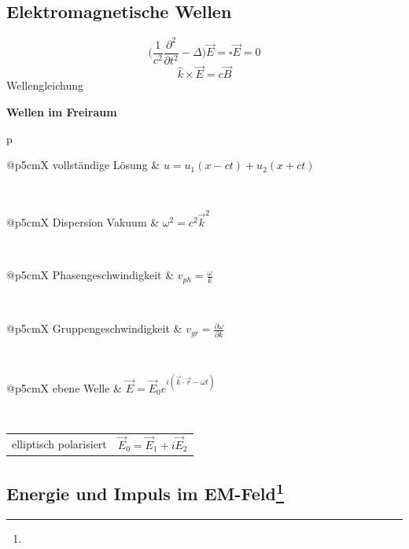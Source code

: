 \documentclass[12pt,a4paper, twoside]{article}
\makeatletter
\newcommand{\pd}[2]{\frac{\partial #1}{\partial #2}}
\newcommand{\pdd}[2]{\frac{\partial^2 #1}{\partial #2^2}}
\renewcommand{\=}[1]{\stackrel{#1}{=}}
\newcommand{\ort}{\vec r}
\theoremstyle{definition}
\theoremstyle{remark}
\newcommand{\concept}[2]{%
\noindent
\begin{framed}
\noindent\textbf{#1}
\par\begin{tabular}{p{\linewidth}}
#2
\end{tabular}
\end{framed}
}
\newcommand{\f}[2]{%
\noindent\begin{tabularx}{\linewidth}{@{}p{5cm}X}
#1 & $#2$
\end{tabularx}}
\makeatother
\begin{document}
\subsection{Elektromagnetische Wellen}

\begin{center}
\begin{framed}
$$\Big(\frac{1}{c^2} \pdd{}{t} - \Delta\Big) \vec E = \square \vec E = 0$$
$$\hat k \times \vec E = c \vec B$$
\centering Wellengleichung
\end{framed}
\end{center}

\concept{Wellen im Freiraum}{
\f{vollständige Lösung}{u = u_1 (x-ct) + u_2 (x+ct)}\\
\f{Dispersion Vakuum}{\omega^2 = c^2 \vec k^2}\\
\f{Phasengeschwindigkeit}{v_{ph} = \frac{\omega}{k}}\\
\f{Gruppengeschwindigkeit}{v_{gr} = \pd{\omega}{k}}\\
\f{ebene Welle}{\vec E = \vec E_0 e^{i(\vec k \cdot \ort - \omega t)}}\\
\f{elliptisch polarisiert}{\vec E_0 = \vec E_1 + i \vec E_2}
}



\subsection[Energie und Impuls im EM-Feld]{Energie und Impuls im EM-Feld\let\thefootnote\relax\footnote{}}
\end{document}

